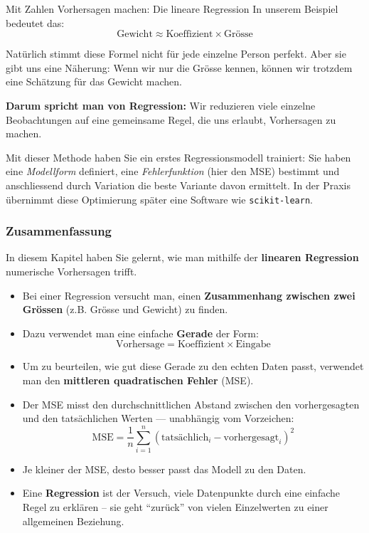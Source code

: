 \begin{lpu}{Mit Zahlen Vorhersagen machen: Die lineare Regression}
In unserem Beispiel bedeutet das:
\[
\text{Gewicht} \approx \text{Koeffizient} \times \text{Grösse}
\]

Natürlich stimmt diese Formel nicht für jede einzelne Person perfekt. Aber sie gibt uns eine Näherung: Wenn wir nur die Grösse kennen, können wir trotzdem eine Schätzung für das Gewicht machen.

\textbf{Darum spricht man von Regression:} Wir reduzieren viele einzelne Beobachtungen auf eine gemeinsame Regel, die uns erlaubt, Vorhersagen zu machen.


\begin{theorie}
Mit dieser Methode haben Sie ein erstes Regressionsmodell trainiert: Sie haben eine \emph{Modellform} definiert, eine \emph{Fehlerfunktion} (hier den MSE) bestimmt und anschliessend durch Variation die beste Variante davon ermittelt. In der Praxis übernimmt diese Optimierung später eine Software wie \texttt{scikit-learn}.
\end{theorie}

\subsubsection*{Zusammenfassung}

In diesem Kapitel haben Sie gelernt, wie man mithilfe der \textbf{linearen Regression} numerische Vorhersagen trifft.

\begin{itemize}
  \item Bei einer Regression versucht man, einen \textbf{Zusammenhang zwischen zwei Grössen} (z.B. Grösse und Gewicht) zu finden.
  \item Dazu verwendet man eine einfache \textbf{Gerade} der Form:
  \[
  \text{Vorhersage} = \text{Koeffizient} \times \text{Eingabe}
  \]
  \item Um zu beurteilen, wie gut diese Gerade zu den echten Daten passt, verwendet man den \textbf{mittleren quadratischen Fehler} (MSE).  
  \item Der MSE misst den durchschnittlichen Abstand zwischen den vorhergesagten und den tatsächlichen Werten — unabhängig vom Vorzeichen:
  \[
  \text{MSE} = \frac{1}{n} \sum_{i=1}^{n} (\text{tatsächlich}_i - \text{vorhergesagt}_i)^2
  \]
  \item Je kleiner der MSE, desto besser passt das Modell zu den Daten.
  \item Eine \textbf{Regression} ist der Versuch, viele Datenpunkte durch eine einfache Regel zu erklären – sie geht ``zurück'' von vielen Einzelwerten zu einer allgemeinen Beziehung.
\end{itemize}


\end{lpu}
